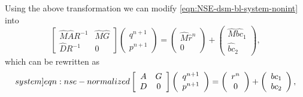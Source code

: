 \documentclass{article}
\begin{document}
Using the above transformation we can modify \cref{eqn:NSE-dsm-bl-system-nonint}
into 
\begin{equation*}
\left[\begin{array}{cc}
\hat{M}\hat{A}R^{-1} & \hat{M}\hat{G} \\
\hat{D}R^{-1} & 0
\end{array}\right]\left(\begin{array}{c}
q^{n+1} \\
p^{n+1}
\end{array}\right)=\left(\begin{array}{c}
\hat{M}\hat{r}^n \\
0
\end{array}\right)+\left(\begin{array}{c}
\hat{M}\widehat{b c}_1 \\
\widehat{b c}_2
\end{array}\right),
\end{equation*}
which can be rewritten as 
\begin{equation}\label[system]{eqn:nse-normalized}
\left[\begin{array}{cc}
A & G \\
D & 0
\end{array}\right]\left(\begin{array}{c}
q^{n+1} \\
p^{n+1}
\end{array}\right)=\left(\begin{array}{c}
r^n \\
0
\end{array}\right)+\left(\begin{array}{c}
{b c}_1 \\
{b c}_2
\end{array}\right),
\end{equation}
\end{document}
